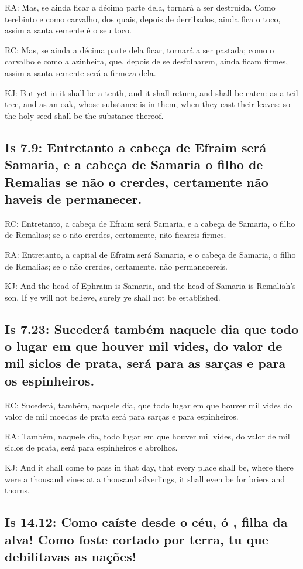 RA: Mas, se ainda ficar a décima parte dela, tornará a ser destruída. Como terebinto e como carvalho, dos quais, depois de derribados, ainda fica o toco, assim a santa semente é o seu toco.

RC: Mas, se ainda a décima parte dela ficar, tornará a ser pastada; como o carvalho e como a azinheira, que, depois de se desfolharem, ainda ficam firmes, assim a santa semente será a firmeza dela.

KJ: But yet in it shall be a tenth, and it shall return, and shall be eaten: as a teil tree, and as an oak, whose substance is in them, when they cast their leaves: so the holy seed shall be the substance thereof.

\subsection{Is 7.9: Entretanto a cabeça de Efraim será Samaria, e a cabeça de Samaria o filho de Remalias\uwave{;} se não o crerdes, certamente não haveis de permanecer.}

RC: Entretanto, a cabeça de Efraim será Samaria, e a cabeça de Samaria, o filho de Remalias; se o não crerdes, certamente, não ficareis firmes.

RA: Entretanto, a capital de Efraim será Samaria, e o cabeça de Samaria, o filho de Remalias; se o não crerdes, certamente, não permanecereis.

KJ: And the head of Ephraim is Samaria, and the head of Samaria is Remaliah's son. If ye will not believe, surely ye shall not be established.

\subsection{Is 7.23: Sucederá também naquele dia que todo o lugar\uwave{,} em que houver mil vides, do valor de mil siclos de prata, será para as sarças e para os espinheiros.}

RC: Sucederá, também, naquele dia, que todo lugar em que houver mil vides do valor de mil moedas de prata será para sarças e para espinheiros.

RA: Também, naquele dia, todo lugar em que houver mil vides, do valor de mil siclos de prata, será para espinheiros e abrolhos.

KJ: And it shall come to pass in that day, that every place shall be, where there were a thousand vines at a thousand silverlings, it shall even be for briers and thorns.

\subsection{Is 14.12: Como caíste desde o céu, ó , filha da alva! Como foste cortado por terra, tu que debilitavas as nações!}

